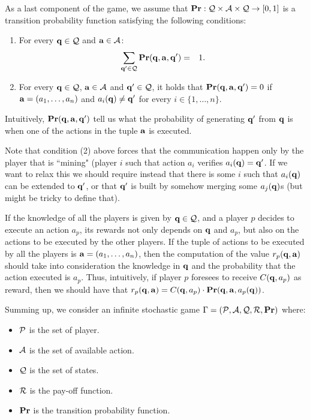 As a last component of the game, we assume that $\mathbf{Pr} : \mathcal{Q} \times \mathcal{A} \times \mathcal{Q} \to [0,1]$ is a transition probability function satisfying the following conditions:
\begin{enumerate}
\item For every $\mathbf{q} \in \mathcal{Q}$ and $\mathbf{a} \in \mathcal{A}$:
\begin{eqnarray*}
\sum_{\mathbf{q}' \in \mathcal{Q}} \mathbf{Pr}(\mathbf{q}, \mathbf{a}, \mathbf{q}' ) & = & 1.
\end{eqnarray*}

\item For every $\mathbf{q} \in \mathcal{Q}$, $\mathbf{a} \in \mathcal{A}$ and $\mathbf{q}' \in \mathcal{Q}$, it holds that $\mathbf{Pr}(\mathbf{q}, \mathbf{a}, \mathbf{q}') = 0$ if $\mathbf{a} = (a_1, \ldots, a_n)$ and $a_i(\mathbf{q}) \neq \mathbf{q}'$ for every $i \in \{1, \ldots, n\}$.
\end{enumerate}
Intuitively, $\mathbf{Pr}(\mathbf{q}, \mathbf{a}, \mathbf{q}')$ tell us what the probability of generating $\mathbf{q}'$ from $\mathbf{q}$ is when one of the actions in the tuple $\mathbf{a}$ is executed.

Note that condition (2) above forces that the communication happen only by the player that is ``mining" (player $i$ such that 
action $a_i$ verifies $a_i(\mathbf{q}) = \mathbf{q}'$. If we want to relax this we should require instead that there is some $i$ such that $a_i(\mathbf{q})$ can be extended to $\mathbf{q}'$, or that $\mathbf{q}'$ is built by somehow merging some $a_j(\mathbf{q})$s (but might be tricky to define that).


If the knowledge of all the players is given by $\mathbf{q} \in \mathcal{Q}$, and a player $p$ decides to execute an action $a_p$, its rewards not only depends on $\mathbf{q}$ and $a_p$, but also on the actions to be executed by the other players. If the tuple of actions to be executed by all the players is $\mathbf{a} = (a_1, \ldots, a_n)$, then the computation of the value $r_p(\mathbf{q}, \mathbf{a})$ should take into consideration the knowledge in $\mathbf{q}$ and the probability that the action executed is $a_p$. Thus, intuitively, if player $p$ foresees to receive $C(\mathbf{q}, a_p)$ as reward, then we should have that $r_p(\mathbf{q}, \mathbf{a}) = C(\mathbf{q}, a_p) \cdot \mathbf{Pr}(\mathbf{q}, \mathbf{a}, a_p(\mathbf{q}))$.

Summing up, we consider an infinite stochastic game $\Gamma = (\mathcal{P},\mathcal{A},\mathcal{Q},\mathcal{R},\mathbf{Pr})$ where:
\begin{itemize}
	\item $\mathcal{P}$ is the set of player.
	\item $\mathcal{A}$ is the set of available action.
	\item $\mathcal{Q}$ is the set of states.
	\item $\mathcal{R}$ is the pay-off function.
	\item $\mathbf{Pr}$ is the transition probability function.
\end{itemize} 


